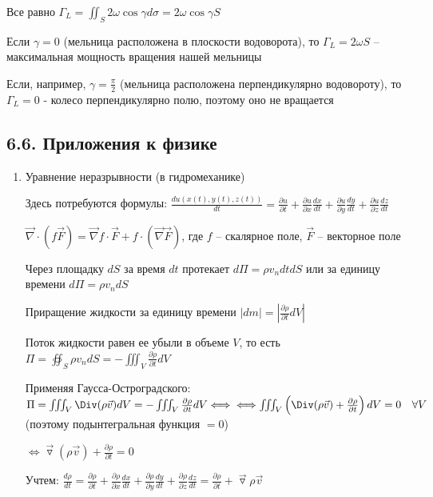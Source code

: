 \documentclass[12pt]{article}
\begin{document}
    Все равно $\Gamma_L = \iint_S 2\omega \cos \gamma d\sigma = 2\omega\cos \gamma S$

    Если $\gamma = 0$ (мельница расположена в плоскости водоворота), то $\Gamma_L = 2\omega S$ -- максимальная мощность вращения нашей мельницы

    Если, например, $\gamma = \frac{\pi}{2}$ (мельница расположена перпендикулярно водовороту), то $\Gamma_L = 0$ - колесо перпендикулярно полю, поэтому оно не вращается

    \subsection{6.6. Приложения к физике}

    \begin{enumerate}[label*=\arabic** ]
        \item Уравнение неразрывности (в гидромеханике)

        \Nota Здесь потребуются формулы:
        $\frac{du(x(t), y(t), z(t))}{dt} = \frac{\partial u}{\partial t} + \frac{\partial u}{\partial x}\frac{dx}{dt} + \frac{\partial u}{\partial y}\frac{dy}{dt} + \frac{\partial u}{\partial z}\frac{dz}{dt}$

        $\vec\nabla \cdot (f\vec{F}) = \vec\nabla f \cdot \vec{F} + f \cdot (\vec\nabla \vec{F})$, где $f$ -- скалярное поле, $\vec{F}$ -- векторное поле


        Через площадку $dS$ за время $dt$ протекает $d\Pi = \rho v_n dt dS$ или за единицу времени $d\Pi = \rho v_n dS$

        Приращение жидкости за единицу времени $|dm| = \left|\frac{\partial \rho}{\partial t} dV\right|$

        Поток жидкости равен ее убыли в объеме $V$, то есть $\Pi = \oiint_S \rho v_n dS = -\iiint_V \frac{\partial \rho}{\partial t} dV$

        Применяя \Ths Гаусса-Остроградского: $\Pi = \iiint_V \Div (\rho \vec{v}) dV = -\iiint_V \frac{\partial \rho}{\partial t} dV \Longleftrightarrow \\
        \Longleftrightarrow \iiint_V \left(\Div (\rho \vec{v}) + \frac{\partial \rho}{\partial t}\right) dV = 0 \quad \forall V$ (поэтому подынтегральная функция $= 0$)


    $\Longleftrightarrow \overrightarrow{\triangledown} (\rho \overrightarrow{v}) + \frac{\partial \rho}{\partial t} = 0$

    Учтем: $\frac{d \rho}{dt} = \frac{\partial \rho}{\partial t} +  \frac{\partial \rho}{\partial x} \frac{dx}{dt} +  \frac{\partial \rho}{\partial y} \frac{dy}{dt} + \frac{\partial \rho}{\partial z} \frac{dz}{dt} = \frac{\partial \rho}{\partial t} + \overrightarrow{\triangledown} \rho \overrightarrow{v}$


\end{enumerate}
\end{document}
